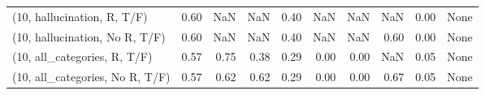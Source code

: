 \begin{table*}[h!]
\begin{adjustbox}{width=2\columnwidth,center}
\begin{tabular}{lrrr|rrr|rrr}
(10, hallucination, R, T/F)           &                      0.60 &                   NaN &                       NaN &                          0.40 &                       NaN &                           NaN &                                    NaN &                               0.00 &                                  None \\
(10, hallucination, No R, T/F)        &                      0.60 &                   NaN &                       NaN &                          0.40 &                       NaN &                           NaN &                                   0.60 &                               0.00 &                                  None \\
(10, all\_categories, R, T/F)          &                      0.57 &                  0.75 &                      0.38 &                          0.29 &                      0.00 &                          0.00 &                                    NaN &                               0.05 &                                  None \\
(10, all\_categories, No R, T/F)       &                      0.57 &                  0.62 &                      0.62 &                          0.29 &                      0.00 &                          0.00 &                                   0.67 &                               0.05 &                                  None \\




\end{tabular}
\end{adjustbox}
\end{table*}
